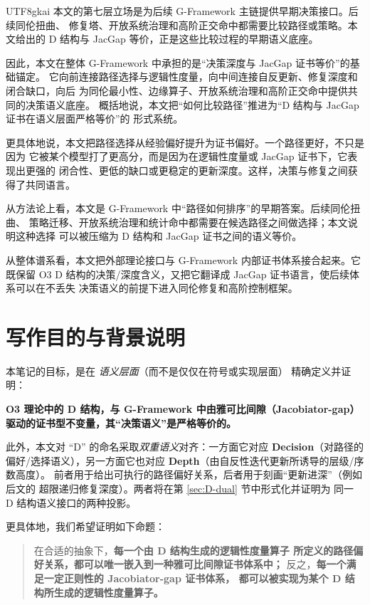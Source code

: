\documentclass[12pt]{article}
\begin{document}
\begin{CJK*}{UTF8}{gkai}
本文的第七层立场是为后续 G-Framework 主链提供早期决策接口。后续同伦扭曲、
修复塔、开放系统治理和高阶正交命中都需要比较路径或策略。本文给出的 D 结构与
JacGap 等价，正是这些比较过程的早期语义底座。

因此，本文在整体 G-Framework 中承担的是“决策深度与 JacGap 证书等价”的基础锚定。
它向前连接路径选择与逻辑性度量，向中间连接自反更新、修复深度和闭合缺口，向后
为同伦最小性、边缘算子、开放系统治理和高阶正交命中提供共同的决策语义底座。
概括地说，本文把“如何比较路径”推进为“D 结构与 JacGap 证书在语义层面严格等价”的
形式系统。

更具体地说，本文把路径选择从经验偏好提升为证书偏好。一个路径更好，不只是因为
它被某个模型打了更高分，而是因为在逻辑性度量或 JacGap 证书下，它表现出更强的
闭合性、更低的缺口或更稳定的更新深度。这样，决策与修复之间获得了共同语言。

从方法论上看，本文是 G-Framework 中“路径如何排序”的早期答案。后续同伦扭曲、
策略迁移、开放系统治理和统计命中都需要在候选路径之间做选择；本文说明这种选择
可以被压缩为 D 结构和 JacGap 证书之间的语义等价。

从整体谱系看，本文把外部理论接口与 G-Framework 内部证书体系接合起来。它既保留
O3 D 结构的决策/深度含义，又把它翻译成 JacGap 证书语言，使后续体系可以在不丢失
决策语义的前提下进入同伦修复和高阶控制框架。

\tableofcontents
\clearpage

\section{写作目的与背景说明}

本笔记的目标，是在 \emph{语义层面}（而不是仅仅在符号或实现层面）
精确定义并证明：
\begin{center}
  \textbf{O3 理论中的 D 结构，与 G-Framework 中由雅可比间隙（Jacobiator-gap）
  驱动的证书型不变量，其“决策语义”是严格等价的。}
\end{center}

此外，本文对 “D” 的命名采取\emph{双重语义}对齐：一方面它对应
\textbf{Decision}（对路径的偏好/选择语义），另一方面它也对应
\textbf{Depth}（由自反性迭代更新所诱导的层级/序数高度）。
前者用于给出可执行的路径偏好关系，后者用于刻画“更新进深”（例如后文的
超限递归修复深度）。两者将在第 \ref{sec:D-dual} 节中形式化并证明为
同一 D 结构语义接口的两种投影。

更具体地，我们希望证明如下命题：
\begin{quotation}
  在合适的抽象下，\textbf{每一个由 D 结构生成的逻辑性度量算子
  所定义的路径偏好关系，都可以唯一嵌入到一种雅可比间隙证书体系中；}
  反之，\textbf{每一个满足一定正则性的 Jacobiator-gap 证书体系，
  都可以被实现为某个 D 结构所生成的逻辑性度量算子。}
\end{quotation}


\end{CJK*}
\end{document}

